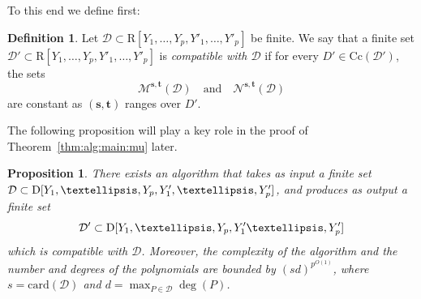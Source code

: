 \documentclass{amsart}[10pts]
\newtheorem{proposition}{Proposition}[section]
\theoremstyle{definition}
\newtheorem{definition}{Definition}[section]
\theoremstyle{remark}
\theoremstyle{observation}
\numberwithin{equation}{section}
\newcommand {\R} {\mathrm{R}}
\newcommand {\D}     {\mbox{\rm D}}
\newcommand{\card}{\mathrm{card}}
\newcommand{\Cc}{\mathrm{Cc}}
\begin{document}
To this end we define first:

\begin{definition}
\label{property:alg:mu}
Let $\mathcal D\subset \R[Y_1,\ldots,Y_p,Y'_1,\ldots,Y'_p]$ be finite.
We say that a finite set $\mathcal D'\subset \R[Y_1,\ldots,Y_p,Y'_1,\ldots,Y'_p]$ is \emph{compatible with $\mathcal D$} if for every $D'\in \Cc(\mathcal D')$, the sets
\[
\mathcal M^{\mathbf s,\mathbf t}(\mathcal D)
\quad\text{and}\quad
\mathcal N^{\mathbf s,\mathbf t}(\mathcal D)
\]
are constant as $(\mathbf s,\mathbf t)$ ranges over $D'$.
\end{definition}

The following proposition will play a key role in the proof of Theorem~\ref{thm:alg:main:mu} later.

\begin{proposition}
\label{prop:alg:main:mu}
     There exists an algorithm that takes as input a finite set
     $\mathcal{D} \subset \D[Y_1,\ldots,Y_p,Y_1',\ldots,Y_p']$, 
     and produces as output a finite set 
     \[
     \mathcal{D}' \subset \D[Y_1,\ldots,Y_p,Y_1'\ldots,Y_p']
     \]
     which is compatible with $\mathcal{D}$.
     Moreover, the complexity of the algorithm and the number and degrees of the polynomials are bounded by $(s d)^{p^{O(1)}}$,
     where $s = \card(\mathcal{D})$ and $d = \max_{P \in \mathcal{D}} \deg(P)$.
\end{proposition}
\end{document}
